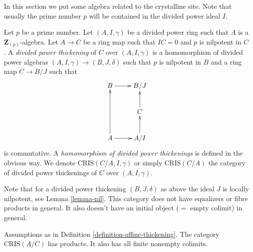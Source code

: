 \noindent
In this section we put some algebra related to the crystalline site.
Note that usually the prime number $p$ will be contained in the
divided power ideal $I$.

\begin{definition}
\label{definition-affine-thickening}
Let $p$ be a prime number. Let $(A, I, \gamma)$ be a divided power
ring such that $A$ is a $\mathbf{Z}_{(p)}$-algebra. Let $A \to C$ be a
ring map such that $IC = 0$ and $p$ is nilpotent in $C$.
A {\it divided power thickening} of $C$ over $(A, I, \gamma)$
is a homomorphism of divided power algebras
$(A, I, \gamma) \to (B, J, \delta)$ such that $p$ is nilpotent in $B$
and a ring map $C \to B/J$ such that
$$
\xymatrix{
B \ar[r] & B/J \\
& C \ar[u] \\
A \ar[uu] \ar[r] & A/I \ar[u]
}
$$
is commutative. A {\it homomorphism of divided power thickenings}
is defined in the obvious way. We denote $\text{CRIS}(C/A, I, \gamma)$
or simply $\text{CRIS}(C/A)$ the category of divided power thickenings
of $C$ over $(A, I, \gamma)$.
\end{definition}

\noindent
Note that for a divided power thickening $(B, J, \delta)$ as above
the ideal $J$ is locally nilpotent, see Lemma \ref{lemma-nil}.
This category does not have equalizers or fibre products in general.
It also doesn't have an initial object ($=$ empty colimit) in general.

\begin{lemma}
\label{lemma-affine-thickenings-colimits}
Assumptions as in Definition \ref{definition-affine-thickening}.
The category $\text{CRIS}(A/C)$ has products.
It also has all finite nonempty colimits.
\end{lemma}

